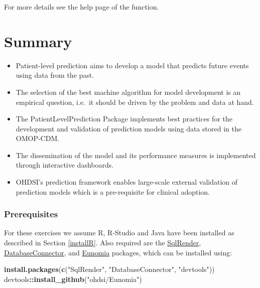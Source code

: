 \documentclass[11pt]{book}
\newenvironment{Shaded}{\begin{snugshade}}{\end{snugshade}}
\newcommand{\KeywordTok}[1]{\textcolor[rgb]{0.13,0.29,0.53}{\textbf{#1}}}
\newcommand{\NormalTok}[1]{#1}
\newcommand{\OperatorTok}[1]{\textcolor[rgb]{0.81,0.36,0.00}{\textbf{#1}}}
\newcommand{\StringTok}[1]{\textcolor[rgb]{0.31,0.60,0.02}{#1}}
\theoremstyle{definition}
\theoremstyle{definition}
\theoremstyle{definition}
\theoremstyle{remark}
\let\BeginKnitrBlock\begin \let\EndKnitrBlock\end
\begin{document}
For more details see the help page of the function.

\hypertarget{summary-10}{%
\section{Summary}\label{summary-10}}

\BeginKnitrBlock{rmdsummary}
\begin{itemize}
\item
  Patient-level prediction aims to develop a model that predicts future events using data from the past.
\item
  The selection of the best machine algorithm for model development is an empirical question, i.e.~it should be driven by the problem and data at hand.
\item
  The PatientLevelPrediction Package implements best practices for the development and validation of prediction models using data stored in the OMOP-CDM.
\item
  The dissemination of the model and its performance measures is implemented through interactive dashboards.
\item
  OHDSI's prediction framework enables large-scale external validation of prediction models which is a pre-requisite for clinical adoption.
\end{itemize}
\EndKnitrBlock{rmdsummary}

\hypertarget{prerequisites-1}{%
\subsubsection*{Prerequisites}\label{prerequisites-1}}

For these exercises we assume R, R-Studio and Java have been installed as described in Section \ref{installR}. Also required are the \href{https://ohdsi.github.io/SqlRender/}{SqlRender}, \href{https://ohdsi.github.io/DatabaseConnector/}{DatabaseConnector}, and \href{https://ohdsi.github.io/Eunomia/}{Eunomia} packages, which can be installed using:

\begin{Shaded}
\begin{Highlighting}[]
\KeywordTok{install.packages}\NormalTok{(}\KeywordTok{c}\NormalTok{(}\StringTok{"SqlRender"}\NormalTok{, }\StringTok{"DatabaseConnector"}\NormalTok{, }\StringTok{"devtools"}\NormalTok{))}
\NormalTok{devtools}\OperatorTok{::}\KeywordTok{install_github}\NormalTok{(}\StringTok{"ohdsi/Eunomia"}\NormalTok{)}
\end{Highlighting}
\end{Shaded}
\end{document}
